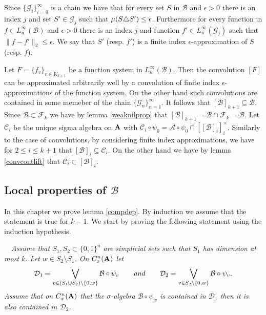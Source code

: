 \documentclass [11pt] {article}
\def\bA{{\bf A}}
\def\bm{{\bf \mu}}
\begin{document}
Since $\{\mathcal{G}_i\}_{i=0}^\infty$ is a chain we have that for every set $S$ in $\mathcal{B}$ and $\epsilon>0$ there is an index $j$ and set $S'\in\mathcal{G}_j$ such that $\bm(S\triangle S')\leq\epsilon$. Furthermore for every function in $f\in L^\infty_u(\mathcal{B})$ and $\epsilon>0$ there is an index $j$ and function $f'\in L_u^\infty(\mathcal{G}_j)$ such that $\|f-f'\|_2\leq\epsilon$. We say that $S'$ (resp. $f'$) is a finite index $\epsilon$-approximation of $S$ (resp. $f$).

Let $F=\{f_v\}_{v\in K_{k+1}}$ be a function system in $L^\infty_u(\mathcal{B})$. Then the convolution $[F]$ can be approximated arbitrarily well by a convolution of finite index $\epsilon$-approximations of the function system. On the other hand such convolutions are contained in some memeber of the chain $\{\mathcal{G}_n\}_{n=1}^\infty$. It follows that  $[\mathcal{B}]_{k+1}\subseteq\mathcal{B}$. Since $\mathcal{B}\subset\mathcal{F}_k$ we have by lemma \ref{weaknilprop} that $[\mathcal{B}]_{k+1}=\mathcal{B}\cap\mathcal{F}_k=\mathcal{B}$.
Let $\mathcal{C}_i$ be the unique sigma algebra on $\bA$ with $\mathcal{C}_i\circ\psi_0=\mathcal{A}\circ\psi_0\cap[[\mathcal{B}]_i]_i^\times$.
Similarly to the case of convolutions, by considering finite index approximations, we have for $2\leq i\leq k+1$ that $[\mathcal{B}]_i
\subseteq\mathcal{C}_i$. On the other hand we have by lemma \ref{convcontlift} that $\mathcal{C}_i\subset[\mathcal{B}]_i$.





\subsection{Local properties of $\mathcal{B}$}

In this chapter we prove lemma \ref{compdep}. By induction we assume that the statement is true for $k-1$. We start by proving the following statement using the induction hypothesis.

\medskip

~~{\it Assume that $S_1,S_2\subset\{0,1\}^n$ are simplicial sets such that $S_1$ has dimension at most $k$. Let $w\in S_2\setminus S_1$. On $C^n_x(\bA)$ let
$$\mathcal{D}_1=\bigvee_{v\in (S_1\cup S_2)\setminus\{0,w\}}\mathcal{B}\circ\psi_v~~~~~~{\it and}~~~~~~\mathcal{D}_2=\bigvee_{v\in S_2\setminus\{0,w\}}\mathcal{B}\circ\psi_v.$$
Assume that on $C^n_x(\bA)$ that the $\sigma$-algebra $\mathcal{B}\circ\psi_w$ is contained in $\mathcal{D}_1$ then it is also contained in $\mathcal{D}_2$.}
\end{document}
